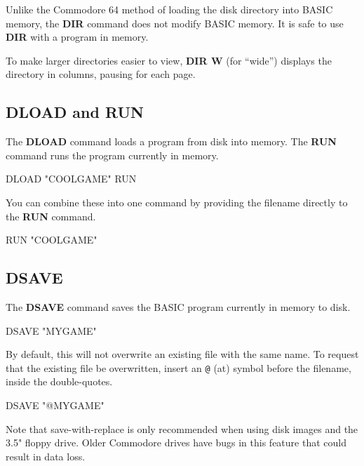 Unlike the Commodore 64 method of loading the disk directory into BASIC memory, the {\bf DIR} command does not modify BASIC memory. It is safe to use {\bf DIR} with a program in memory.

To make larger directories easier to view, {\bf DIR W} (for ``wide'') displays the directory in columns, pausing for each page.

\subsection{DLOAD and RUN}

The {\bf DLOAD} command loads a program from disk into memory. The {\bf RUN} command runs the program currently in memory.

\begin{screencode}
DLOAD "COOLGAME"
RUN
\end{screencode}

You can combine these into one command by providing the filename directly to the {\bf RUN} command.

\begin{screencode}
RUN "COOLGAME"
\end{screencode}

\subsection{DSAVE}

The {\bf DSAVE} command saves the BASIC program currently in memory to disk.

\begin{screencode}
DSAVE "MYGAME"
\end{screencode}

By default, this will not overwrite an existing file with the same name. To request that the existing file be overwritten, insert an {\tt @} (at) symbol before the filename, inside the double-quotes.

\begin{screencode}
DSAVE "@MYGAME"
\end{screencode}

Note that save-with-replace is only recommended when using disk images and the 3.5" floppy drive. Older Commodore drives have bugs in this feature that could result in data loss.

